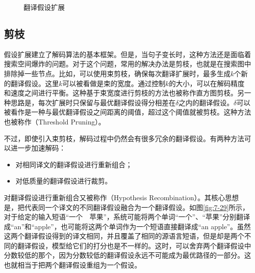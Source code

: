 \begin{figure}[htp]
\centering

\caption{翻译假设扩展}
\label{fig:7-28}
\end{figure}


\subsection{剪枝}

\parinterval 假设扩展建立了解码算法的基本框架。但是，当句子变长时，这种方法还是面临着搜索空间爆炸的问题。对于这个问题，常用的解决办法是剪枝，也就是在搜索图中排除掉一些节点。比如，可以使用束剪枝，确保每次翻译扩展时，最多生成$k$个新的翻译假设。这里$k$可以被看做是束的宽度。通过控制$k$的大小，可以在解码精度和速度之间进行平衡。这种基于束宽度进行剪枝的方法也被称作直方图剪枝。另一种思路是，每次扩展时只保留与最优翻译假设得分相差在$\delta$之内的翻译假设。$\delta$可以被看作是一种与最优翻译假设之间距离的阈值，超过这个阈值就被剪枝。这种方法也被称作{\small{}}（Threshold Pruning）。

\parinterval 不过，即使引入束剪枝，解码过程中仍然会有很多冗余的翻译假设。有两种方法可以进一步加速解码：

\begin{itemize}
\vspace{0.5em}
\item 对相同译文的翻译假设进行重新组合；
\vspace{0.5em}
\item 对低质量的翻译假设进行裁剪。
\vspace{0.5em}
\end{itemize}

\parinterval 对翻译假设进行重新组合又被称作{\small{}}（Hypothesis Recombination）。其核心思想是，把代表同一个译文的不同翻译假设融合为一个翻译假设。如图\ref{fig:7-29}所示，对于给定的输入短语“一个\ \ 苹果”，系统可能将两个单词“一个”、“苹果”分别翻译成“an”和“apple”，也可能将这两个单词作为一个短语直接翻译成“an apple”。虽然这两个翻译假设得到的译文相同，并且覆盖了相同的源语言短语，但是却是两个不同的翻译假设，模型给它们的打分也是不一样的。这时，可以舍弃两个翻译假设中分数较低的那个，因为分数较低的翻译假设永远不可能成为最优路径的一部分。这也就相当于把两个翻译假设重组为一个假设。

